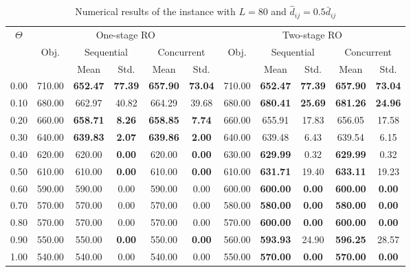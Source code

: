 \documentclass[preprint,review,10pt,round,authoryear]{elsarticle}\usepackage[]{graphicx}\usepackage[]{color}
\theoremstyle{plain}
\theoremstyle{definition}
\theoremstyle{remark}
\begin{document}
\begin{table*}[!ht]
\small
      \caption{Numerical results of the instance with $L=80$ and $\hat{d}_{ij}= 0.5\bar{d}_{ij} $}
      \begin{center}
      \begin{tabular}{||c| c| c| c| c| c| c| c| c|c|c||}
      \hline
      \hline
      \multirow{3}{*}{$\Theta$} &
      \multicolumn{5}{|c|}{One-stage RO} &
      \multicolumn{5}{|c||}{Two-stage RO} \\
      \cline{2-6}
      \cline{7-11}
      &\multirow{2}{*}{Obj.} &
      \multicolumn{2}{|c|}{Sequential} &
      \multicolumn{2}{|c|}{Concurrent} &
      \multirow{2}{*}{Obj.} &
      \multicolumn{2}{|c|}{Sequential} &
      \multicolumn{2}{|c||}{Concurrent}\\
      \cline{3-6}
      \cline{8-11}
      &&Mean&Std.&Mean&Std.&&Mean&Std.&Mean&Std.\\
      \hline%
  \hline
0.00 & 710.00 & \textbf{652.47} & \textbf{77.39} & \textbf{657.90} & \textbf{73.04} & 710.00 & \textbf{652.47} & \textbf{77.39} & \textbf{657.90} & \textbf{73.04} \\ 
   \hline
0.10 & 680.00 & 662.97 & 40.82 & 664.29 & 39.68 & 680.00 & \textbf{680.41} & \textbf{25.69} & \textbf{681.26} & \textbf{24.96} \\ 
   \hline
0.20 & 660.00 & \textbf{658.71} & \textbf{8.26} & \textbf{658.85} & \textbf{7.74} & 660.00 & 655.91 & 17.83 & 656.05 & 17.58 \\ 
   \hline
0.30 & 640.00 & \textbf{639.83} & \textbf{2.07} & \textbf{639.86} & \textbf{2.00} & 640.00 & 639.48 & 6.43 & 639.54 & 6.15 \\ 
   \hline
0.40 & 620.00 & 620.00 & \textbf{0.00} & 620.00 & \textbf{0.00} & 630.00 & \textbf{629.99} & 0.32 & \textbf{629.99} & 0.32 \\ 
   \hline
0.50 & 610.00 & 610.00 & \textbf{0.00} & 610.00 & \textbf{0.00} & 610.00 & \textbf{631.71} & 19.40 & \textbf{633.11} & 19.23 \\ 
   \hline
0.60 & 590.00 & 590.00 & 0.00 & 590.00 & 0.00 & 600.00 & \textbf{600.00} & \textbf{0.00} & \textbf{600.00} & \textbf{0.00} \\ 
   \hline
0.70 & 570.00 & 570.00 & 0.00 & 570.00 & 0.00 & 580.00 & \textbf{580.00} & \textbf{0.00} & \textbf{580.00} & \textbf{0.00} \\ 
   \hline
0.80 & 570.00 & 570.00 & 0.00 & 570.00 & 0.00 & 570.00 & \textbf{600.00} & \textbf{0.00} & \textbf{600.00} & \textbf{0.00} \\ 
   \hline
0.90 & 550.00 & 550.00 & \textbf{0.00} & 550.00 & \textbf{0.00} & 560.00 & \textbf{593.93} & 24.90 & \textbf{596.25} & 28.57 \\ 
   \hline
1.00 & 540.00 & 540.00 & 0.00 & 540.00 & 0.00 & 550.00 & \textbf{570.00} & \textbf{0.00} & \textbf{570.00} & \textbf{0.00} \\ 
  \hline
\hline
      \end{tabular}
      \end{center}
      \label{table:2}
      \end{table*}
\end{document}
